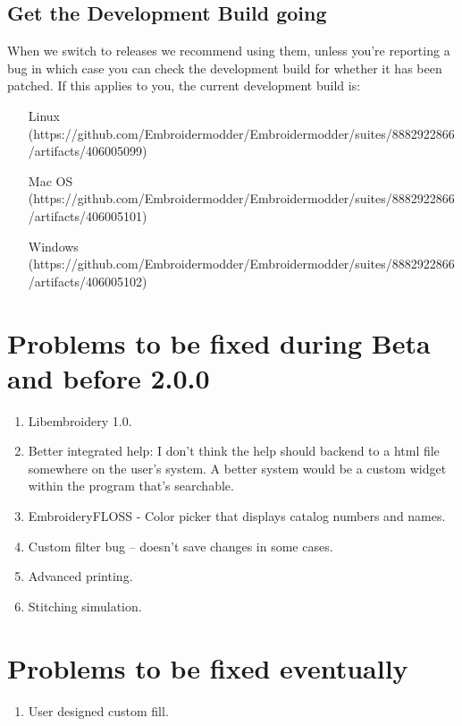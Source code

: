 \documentclass{report}
\begin{document}
\subsection{Get the Development Build going}

When we switch to releases we recommend using them, unless you're reporting a bug in which case you can check the development build for whether it has been patched. If this applies to you, the current development build is:

\begin{itemize}
\item [Linux](https://github.com/Embroidermodder/Embroidermodder/suites/8882922866/artifacts/406005099)
\item [Mac OS](https://github.com/Embroidermodder/Embroidermodder/suites/8882922866/artifacts/406005101)
\item [Windows](https://github.com/Embroidermodder/Embroidermodder/suites/8882922866/artifacts/406005102)
\end{itemize}

\section{Problems to be fixed during Beta and before 2.0.0}

\begin{enumerate}
\item Libembroidery 1.0.
\item Better integrated help: I don't think the help should backend to a html file somewhere on the user's system. A better system would be a custom widget within the program that's searchable.
\item EmbroideryFLOSS - Color picker that displays catalog numbers and names.
\item Custom filter bug -- doesn't save changes in some cases.
\item Advanced printing.
\item Stitching simulation.
\end{enumerate}

\section{Problems to be fixed eventually}

\begin{enumerate}
\item User designed custom fill.
\end{enumerate}
\end{document}
